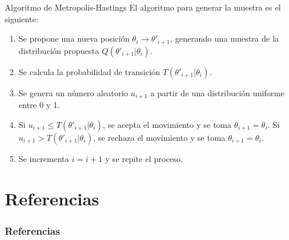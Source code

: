 \documentclass{beamer}
\begin{document}
	\begin{frame}{Algoritmo de Metropolis-Hastings}
	El algoritmo para generar la muestra es el siguiente:
	\begin{enumerate}
		\item Se propone una nueva posición $\theta_i\rightarrow\theta'_{i+1}$, generando una muestra de la distribución propuesta $Q(\theta'_{i+1}|\theta_i)$.
		\item Se calcula la probabilidad de transición $T(\theta'_{i+1}|\theta_i)$.
		\item Se genera un número aleatorio $u_{i+1}$ a partir de una distribución uniforme entre 0 y 1.
		\item Si $u_{i+1}\leq T(\theta'_{i+1}|\theta_i)$, se acepta el movimiento y se toma $\theta_{i+1}=\theta_i$. Si $u_{i+1}> T(\theta'_{i+1}|\theta_i)$, se rechaza el movimiento y se toma $\theta_{i+1}=\theta_i$.
		\item Se incrementa $i=i+1$ y se repite el proceso.
	\end{enumerate}
	
	\end{frame}
	\section{Referencias}
	\begin{frame}[allowframebreaks]
	\frametitle{Referencias}

	\nocite{*}
	
	

	\end{frame}
	
\end{document}
